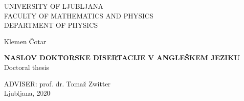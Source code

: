 \setcounter{topnumber}{4}
\setcounter{bottomnumber}{4}
\setcounter{totalnumber}{5}
\renewcommand{\topfraction}{0.99}
\renewcommand{\bottomfraction}{0.99}
\renewcommand{\textfraction}{0.0}
\setlength{\tabcolsep}{10pt}
\renewcommand{\arraystretch}{1.5}

\def\bi#1{\hbox{\boldmath{$#1$}}}
\let\oldvec\vec
\def\vec#1{\mbox{\boldmath$#1$}}
\def\pol{{\textstyle{1\over2}}}
\def\svec#1{\mbox{{\scriptsize \boldmath$#1$}}}



%
%




\pagestyle{empty}
\begin{center}

{\large UNIVERSITY OF LJUBLJANA\\
FACULTY OF MATHEMATICS AND PHYSICS\\
DEPARTMENT OF PHYSICS\\}

\vspace{4cm}

{\Large Klemen Čotar\\}

\vspace{10mm}

{\bf \Large NASLOV DOKTORSKE DISERTACIJE V ANGLEŠKEM JEZIKU}\\
\vspace{5mm}
{\sc Doctoral thesis}\\

\vfill

{\large ADVISER: prof. dr. Tomaž Zwitter\\

\vspace{2cm}
Ljubljana, 2020}

\end{center}

